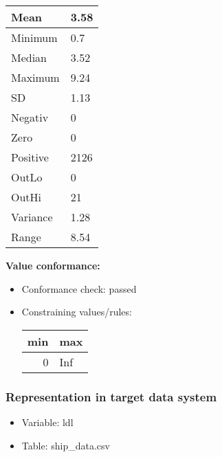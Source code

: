 \documentclass[
]{article}
\providecommand{\tightlist}{%
  \setlength{\itemsep}{0pt}\setlength{\parskip}{0pt}}
\begin{document}
\begin{table}[H]
\centering
\begin{tabular}{l|l}
\hline
Mean & 3.58\\
\hline
Minimum & 0.7\\
\hline
Median & 3.52\\
\hline
Maximum & 9.24\\
\hline
SD & 1.13\\
\hline
Negativ & 0\\
\hline
Zero & 0\\
\hline
Positive & 2126\\
\hline
OutLo & 0\\
\hline
OutHi & 21\\
\hline
Variance & 1.28\\
\hline
Range & 8.54\\
\hline
\end{tabular}
\end{table}

\textbf{Value conformance:}

\begin{itemize}
\tightlist
\item
  Conformance check: passed
\item
  Constraining values/rules:

  \begin{table}[H]
  \centering
  \begin{tabular}{r|l}
  \hline
  \textbf{min} & \textbf{max}\\
  \hline
  0 & Inf\\
  \hline
  \end{tabular}
  \end{table}
\end{itemize}

\newpage

\hypertarget{representation-in-target-data-system-16}{%
\subsubsection{\texorpdfstring{Representation in \textbf{target} data
system}{Representation in target data system}}\label{representation-in-target-data-system-16}}

\begin{itemize}
\tightlist
\item
  Variable: ldl
\item
  Table: ship\_data.csv
\end{itemize}
\end{document}
